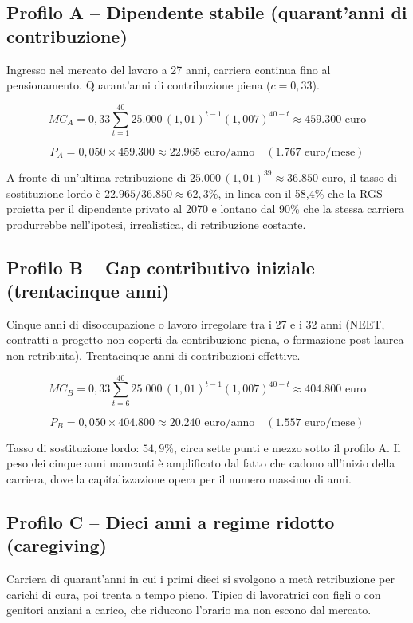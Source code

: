 \subsection*{Profilo A -- Dipendente stabile (quarant'anni di contribuzione)}

\noindent
Ingresso nel mercato del lavoro a 27 anni, carriera continua fino al
pensionamento. Quarant'anni di contribuzione piena ($c = 0{,}33$).

\[
MC_A = 0{,}33 \sum_{t=1}^{40} 25.000\,(1{,}01)^{t-1}(1{,}007)^{40-t}
\approx 459.300 \text{ euro}
\]

\[
P_A = 0{,}050 \times 459.300 \approx 22.965 \text{ euro/anno}
\quad (1.767 \text{ euro/mese})
\]

A fronte di un'ultima retribuzione di $25.000\,(1{,}01)^{39} \approx 36.850$
euro, il tasso di sostituzione lordo è $22.965 / 36.850 \approx 62{,}3\%$, in
linea con il 58,4\% che la RGS proietta per il dipendente privato al 2070
\cite{MEF_RGS2025} e lontano dal 90\% che la stessa carriera produrrebbe
nell'ipotesi, irrealistica, di retribuzione costante.

\subsection*{Profilo B -- Gap contributivo iniziale (trentacinque anni)}

\noindent
Cinque anni di disoccupazione o lavoro irregolare tra i 27 e i 32 anni
(NEET, contratti a progetto non coperti da contribuzione piena, o
formazione post-laurea non retribuita). Trentacinque anni di
contribuzioni effettive.

\[
MC_B = 0{,}33 \sum_{t=6}^{40} 25.000\,(1{,}01)^{t-1}(1{,}007)^{40-t}
\approx 404.800 \text{ euro}
\]

\[
P_B = 0{,}050 \times 404.800 \approx 20.240 \text{ euro/anno}
\quad (1.557 \text{ euro/mese})
\]

Tasso di sostituzione lordo: $54{,}9\%$, circa sette punti e mezzo sotto il
profilo A. Il peso dei cinque anni mancanti è amplificato dal fatto che cadono
all'inizio della carriera, dove la capitalizzazione opera per il numero massimo
di anni.

\subsection*{Profilo C -- Dieci anni a regime ridotto (caregiving)}

\noindent
Carriera di quarant'anni in cui i primi dieci si svolgono a metà retribuzione
per carichi di cura, poi trenta a tempo pieno. Tipico di lavoratrici con figli o
con genitori anziani a carico, che riducono l'orario ma non escono dal mercato.

